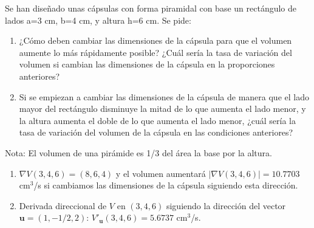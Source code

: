 {Se han diseñado unas cápsulas con forma piramidal con base un rectángulo de lados a=3 cm, b=4 cm, y altura h=6 cm. Se pide:
\begin{enumerate}
\item ¿Cómo deben cambiar las dimensiones de la cápsula para que el volumen aumente lo más rápidamente posible? ¿Cuál sería la tasa de variación del volumen si cambian las dimensiones de la cápsula en la proporciones anteriores?
\item Si se empiezan a cambiar las dimensiones de la cápsula de manera que el lado mayor del rectángulo disminuye la mitad de lo que aumenta el lado menor, y la altura aumenta el doble de lo que aumenta el lado menor, ¿cuál sería la tasa de variación del volumen de la cápsula en las condiciones anteriores?
\end{enumerate}
Nota: El volumen de una pirámide es 1/3 del área la base por la altura.
}
{\begin{enumerate}
\item $\nabla V(3,4,6)=(8,6,4)$ y el volumen aumentará $|\nabla V(3,4,6)|=10.7703$ cm$^3$/s si cambiamos las dimensiones de la cápsula siguiendo esta dirección.
\item Derivada direccional de $V$ en $(3,4,6)$ siguiendo la dirección del vector $\mathbf{u}=(1,-1/2,2)$: $V'_\mathbf{u}(3,4,6)=5.6737$ cm$^3$/s.
\end{enumerate}
}
{
}


